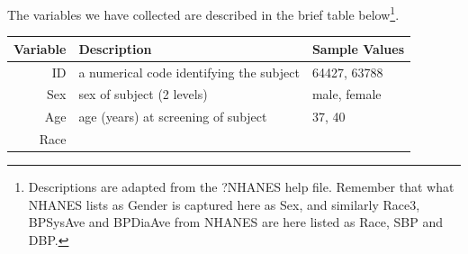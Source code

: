 \documentclass[
]{book}
\begin{document}
The variables we have collected are described in the brief table below\footnote{Descriptions are adapted from the ?NHANES help file. Remember that what NHANES lists as Gender is captured here as Sex, and similarly Race3, BPSysAve and BPDiaAve from NHANES are here listed as Race, SBP and DBP.}.

\begin{longtable}[]{@{}rll@{}}
\toprule
\begin{minipage}[b]{0.15\columnwidth}\raggedleft
Variable\strut
\end{minipage} & \begin{minipage}[b]{0.58\columnwidth}\raggedright
Description\strut
\end{minipage} & \begin{minipage}[b]{0.18\columnwidth}\raggedright
Sample Values\strut
\end{minipage}\tabularnewline
\midrule
\endhead
\begin{minipage}[t]{0.15\columnwidth}\raggedleft
ID\strut
\end{minipage} & \begin{minipage}[t]{0.58\columnwidth}\raggedright
a numerical code identifying the subject\strut
\end{minipage} & \begin{minipage}[t]{0.18\columnwidth}\raggedright
64427, 63788\strut
\end{minipage}\tabularnewline
\begin{minipage}[t]{0.15\columnwidth}\raggedleft
Sex\strut
\end{minipage} & \begin{minipage}[t]{0.58\columnwidth}\raggedright
sex of subject (2 levels)\strut
\end{minipage} & \begin{minipage}[t]{0.18\columnwidth}\raggedright
male, female\strut
\end{minipage}\tabularnewline
\begin{minipage}[t]{0.15\columnwidth}\raggedleft
Age\strut
\end{minipage} & \begin{minipage}[t]{0.58\columnwidth}\raggedright
age (years) at screening of subject\strut
\end{minipage} & \begin{minipage}[t]{0.18\columnwidth}\raggedright
37, 40\strut
\end{minipage}\tabularnewline
\begin{minipage}[t]{0.15\columnwidth}\raggedleft
Race\strut

\end{minipage}
\end{longtable}
\end{document}
